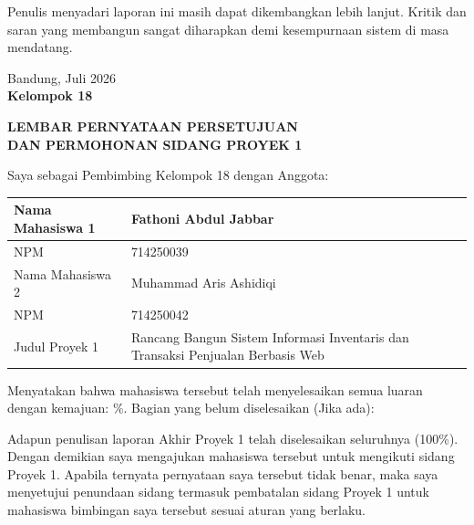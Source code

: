 \documentclass[11pt, a5paper]{article}
\begin{document}
Penulis menyadari laporan ini masih dapat dikembangkan lebih lanjut. Kritik dan
saran yang membangun sangat diharapkan demi kesempurnaan sistem di masa mendatang.

\vspace{1cm}
\begin{flushright}
  Bandung, Juli 2026\\[1.2cm]
  \textbf{Kelompok 18}
\end{flushright}

\newpage
\begin{center}
  {\large\bfseries LEMBAR PERNYATAAN PERSETUJUAN}\\[4pt]
  {\large\bfseries DAN PERMOHONAN SIDANG PROYEK 1}
\end{center}
\vspace{0.6cm}

Saya sebagai Pembimbing Kelompok 18 dengan Anggota:

\vspace{0.5cm}
\begin{center}
\renewcommand{\arraystretch}{1.7}
\begin{tabular}{|p{}|p{}|}
\hline
Nama Mahasiswa 1 & Fathoni Abdul Jabbar \\ \hline
NPM              & 714250039 \\ \hline
Nama Mahasiswa 2 & Muhammad Aris Ashidiqi \\ \hline
NPM              & 714250042 \\ \hline
Judul Proyek 1   & Rancang Bangun Sistem Informasi Inventaris dan
                   Transaksi Penjualan Berbasis Web \\ \hline
\end{tabular}
\end{center}
\vspace{0.5cm}

Menyatakan bahwa mahasiswa tersebut telah menyelesaikan semua luaran dengan
kemajuan: \dotfill\%. Bagian yang belum diselesaikan (Jika ada):

\vspace{0.15cm}
\noindent\dotfill

\vspace{0.1cm}
\noindent\dotfill

\vspace{0.4cm}
Adapun penulisan laporan Akhir Proyek 1 telah diselesaikan seluruhnya (100\%).
Dengan demikian saya mengajukan mahasiswa tersebut untuk mengikuti sidang Proyek
1. Apabila ternyata pernyataan saya tersebut tidak benar, maka saya menyetujui
penundaan sidang termasuk pembatalan sidang Proyek 1 untuk mahasiswa bimbingan
saya tersebut sesuai aturan yang berlaku.
\end{document}

